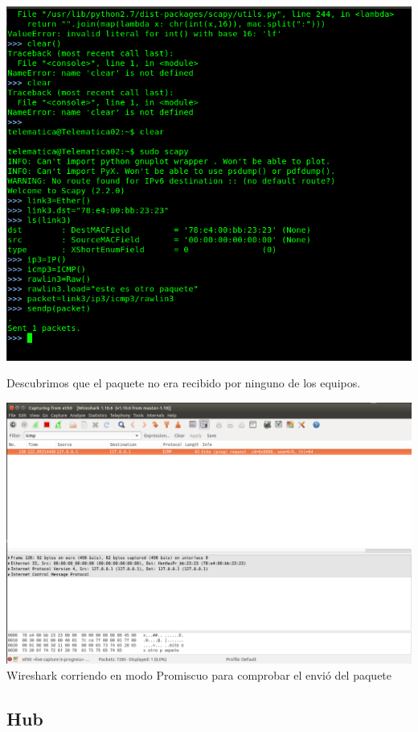 \documentclass[spanish]{udpreport}
\begin{document}
\begin{center}
	\includegraphics[scale=.37]{imagenes/Switch/Test_3.png}
\end{center}

Descubrimos que el paquete no era recibido por ninguno de los equipos.

\begin{center}
	\includegraphics[scale=.27]{imagenes/Switch/Test_3_Wireshark.png}
	\\ Wireshark corriendo en modo Promiscuo para comprobar el envió del paquete
\end{center}

\newpage


\subsection{Hub}
\end{document}
